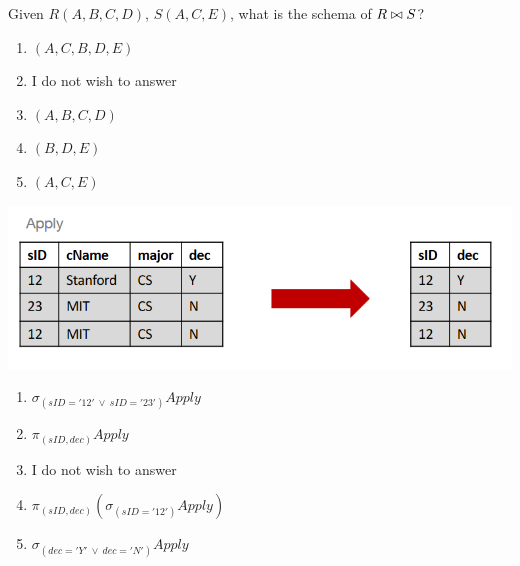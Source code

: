 \documentclass{bdad}
\begin{document}
Given $R(A, B, C, D)$, $S(A, C, E)$, what is the schema of $R \bowtie S$?

\begin{enumerate}
    \item $(A, C, B, D, E)$ \greencheckmark
    \item I do not wish to answer
    \item $(A, B, C, D)$
    \item $(B, D, E)$
    \item $(A, C, E)$
\end{enumerate}

\newpage
{}
\begin{center}
    \includegraphics[scale=0.4]{2020T-25.png}
\end{center}

\begin{enumerate}
    \item $\sigma_{(sID = '12'~\vee~sID = '23')} Apply$
    \item $\pi_{(sID,dec)} Apply$ \greencheckmark
    \item I do not wish to answer
    \item $\pi_{(sID,dec)} (\sigma_{(sID = '12')} Apply)$
    \item $\sigma_{(dec = 'Y'~\vee~dec = 'N')} Apply$
\end{enumerate}
\end{document}

